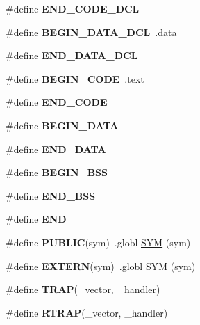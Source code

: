 \begin{DoxyCompactItemize}
\#define {\bfseries E\+N\+D\+\_\+\+C\+O\+D\+E\+\_\+\+D\+CL}
\item 
\mbox{\label{group__RTEMSScoreCPUSPARCASM_ga7f059077f76d2de57e245990dc6fdf25}} 
\#define {\bfseries B\+E\+G\+I\+N\+\_\+\+D\+A\+T\+A\+\_\+\+D\+CL}~.data
\item 
\mbox{\label{group__RTEMSScoreCPUSPARCASM_gaba5951c6a7df52e7c13d07a6823e9758}} 
\#define {\bfseries E\+N\+D\+\_\+\+D\+A\+T\+A\+\_\+\+D\+CL}
\item 
\mbox{\label{group__RTEMSScoreCPUSPARCASM_ga6d6dc213aff5b736968e2aff37eb2c99}} 
\#define {\bfseries B\+E\+G\+I\+N\+\_\+\+C\+O\+DE}~.text
\item 
\mbox{\label{group__RTEMSScoreCPUSPARCASM_gaac423acb743520558daf6a94e1e34534}} 
\#define {\bfseries E\+N\+D\+\_\+\+C\+O\+DE}
\item 
\mbox{\label{group__RTEMSScoreCPUSPARCASM_ga93fba2b033eb50ec004405c59faaa824}} 
\#define {\bfseries B\+E\+G\+I\+N\+\_\+\+D\+A\+TA}
\item 
\mbox{\label{group__RTEMSScoreCPUSPARCASM_gab989978585b78e98ff314e8abb5f9bb0}} 
\#define {\bfseries E\+N\+D\+\_\+\+D\+A\+TA}
\item 
\mbox{\label{group__RTEMSScoreCPUSPARCASM_ga50f110f0489e48ceda4a0473a35d2978}} 
\#define {\bfseries B\+E\+G\+I\+N\+\_\+\+B\+SS}
\item 
\mbox{\label{group__RTEMSScoreCPUSPARCASM_gae8acdd1ba8aa625ce8a829773fd512e2}} 
\#define {\bfseries E\+N\+D\+\_\+\+B\+SS}
\item 
\mbox{\label{group__RTEMSScoreCPUSPARCASM_ga29fd18bed01c4d836c7ebfe73a125c3f}} 
\#define {\bfseries E\+ND}
\item 
\mbox{\label{group__RTEMSScoreCPUSPARCASM_ga5e536c0e80cb78da6a74541281111e40}} 
\#define {\bfseries P\+U\+B\+L\+IC}(sym)~.globl \mbox{\hyperlink{group__RTEMSScoreCPUx86-64ASM_gafe05d428a5f345f51fb591debb815325}{S\+YM}} (sym)
\item 
\mbox{\label{group__RTEMSScoreCPUSPARCASM_ga9808b867f8d1bd54d78548a5cd5dc415}} 
\#define {\bfseries E\+X\+T\+E\+RN}(sym)~.globl \mbox{\hyperlink{group__RTEMSScoreCPUx86-64ASM_gafe05d428a5f345f51fb591debb815325}{S\+YM}} (sym)
\item 
\#define {\bfseries T\+R\+AP}(\+\_\+vector,  \+\_\+handler)
\item 
\#define {\bfseries R\+T\+R\+AP}(\+\_\+vector,  \+\_\+handler)
\end{DoxyCompactItemize}


